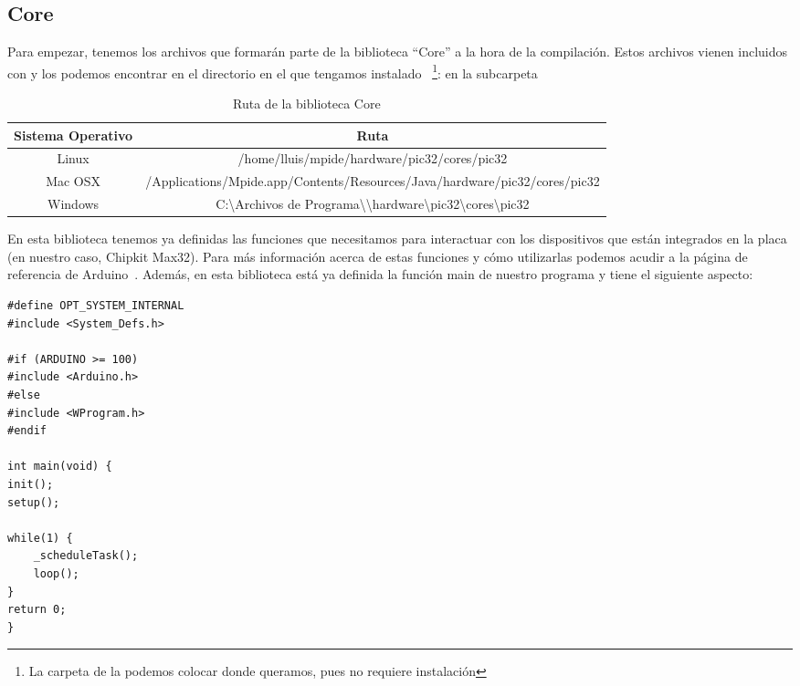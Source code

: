 \subsection{Core}
Para empezar, tenemos los archivos que formarán parte de la biblioteca ``Core'' a la hora de la compilación. Estos archivos vienen incluidos con  y los podemos encontrar en el directorio en el que tengamos instalado ~\protect\footnote{La carpeta de  la podemos colocar donde queramos, pues no requiere instalación}: en la subcarpeta\\

\begin{table}[H]
\begin{center}
\begin{tabular}{| c || c |}
	\hline
	Sistema Operativo & Ruta\\
	\hline
	\hline
	Linux & /home/lluis/mpide/hardware/pic32/cores/pic32\\
	\hline
	Mac OSX & /Applications/Mpide.app/Contents/Resources/Java/hardware/pic32/cores/pic32\\
	\hline
	Windows & C:\textbackslash Archivos de Programa\textbackslash \programa{MPIDE}\textbackslash hardware\textbackslash pic32\textbackslash cores\textbackslash pic32\\
	\hline
\end{tabular}
\end{center}
\caption{Ruta de la biblioteca Core}
\label{tab:core_path}
\end{table}

En esta biblioteca tenemos ya definidas las funciones que necesitamos para interactuar con los dispositivos que están integrados en la placa (en nuestro caso, Chipkit Max32). Para más información acerca de estas funciones y cómo utilizarlas podemos acudir a la página de referencia de Arduino~\cite{website:arduino_funcs}. Además, en esta biblioteca está ya definida la función main de nuestro programa y tiene el siguiente aspecto:

\lstset{language=C++}
\begin{lstlisting}[caption=main.cpp]
#define OPT_SYSTEM_INTERNAL
#include <System_Defs.h>

#if (ARDUINO >= 100)
#include <Arduino.h>
#else
#include <WProgram.h>
#endif

int main(void) {
init();
setup();

while(1) {
	_scheduleTask();
	loop();
}
return 0;
}
\end{lstlisting}

